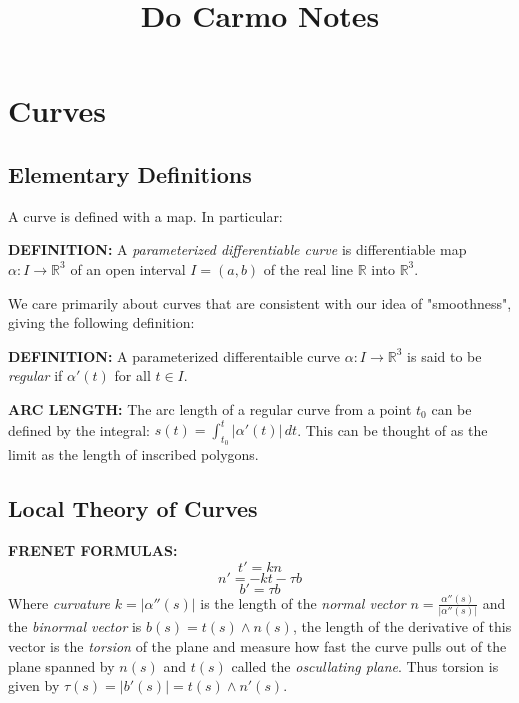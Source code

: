 \documentclass{article}
\title{Do Carmo Notes}
\author{}
\date{}
\begin{document}
\maketitle
\section{Curves}
\subsection{Elementary Definitions}
A curve is defined with a map. In particular:\vspace{5mm}

\textbf{DEFINITION:} A \textit{parameterized differentiable curve} is differentiable map $\alpha: I \to \mathbb{R}^3$ of an open interval $I = (a,b)$ of the real line $\mathbb{R}$
into $\mathbb{R}^3$. \vspace{5mm}

We care primarily about curves that are consistent with our idea of "smoothness", giving the following definition: \vspace{5mm}

\textbf{DEFINITION:} A parameterized differentaible curve $\alpha: I \to \mathbb{R}^3$ is said to be \textit{regular} if $\alpha'(t)$ for all $t \in I$. \vspace{5mm}

\textbf{ARC LENGTH:} The arc length of a regular curve from a point $t_0$ can be defined by the integral: $\displaystyle s(t) = \int_{t_0}^{t} \vert \alpha'(t) \vert \,dt$. This can be thought of as the limit as the length of inscribed polygons.

\subsection{Local Theory of Curves}

\textbf{FRENET FORMULAS:} $$t' = kn$$ $$n' = -kt - \tau b$$ $$b' = \tau b$$ Where \textit{curvature} $k = \vert \alpha''(s) \vert$ is the length of the \textit{normal vector} $\displaystyle n = \frac{\alpha''(s)}{\vert \alpha''(s) \vert}$ and the \textit{binormal vector} is $b(s) = t(s) \wedge n(s)$, the length of the derivative of this vector is the \textit{torsion} of the plane and measure how fast the curve pulls out of the plane spanned by $n(s)$ and $t(s)$ called the \textit{oscullating plane}. Thus torsion is given by $\tau(s) = \vert b'(s) \vert = t(s) \wedge n'(s)$. \vspace{5mm}
\end{document}
